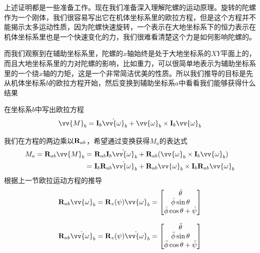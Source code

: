 \documentclass[11pt]{article}
\begin{document}
上述证明都是一些准备工作。现在我们准备深入理解陀螺的运动原理。旋转的陀螺作为一个刚体，我们很容易写出它在机体坐标系里的欧拉方程，但是这个方程并不能揭示太多运动性质，因为陀螺快速旋转，一个表示在大地坐标系下的恒力表示在机体坐标系里也是一个快速变化的力，我们很难看清楚这个力是如何影响陀螺的。

而我们观察到在辅助坐标系里，陀螺的$x$轴始终是处于大地坐标系的$XY$平面上的，而且大地坐标系里的力对陀螺的影响，比如重力，可以很简单地表示为辅助坐标系里的一个绕$x$轴的力矩，这是一个非常简洁优美的性质。所以我们推导的目标是先从机体坐标系$b$的欧拉方程开始，然后变换到辅助坐标系$a$中看看我们能够获得什么结果
 
在坐标系$b$中写出欧拉方程
$$
\vv{M}_b = {\bf I}_b\dot{\vv{\omega}}_b + \vv{\omega}_b \times {\bf I}_b\vv{\omega}_b
$$

我们在方程的两边乘以${\bf R}_{ab}$，希望通过变换获得$M_a$的表达式
\begin{align*}
M_a = {\bf R}_{ab}\vv{M}_b = & \ {\bf R}_{ab}{\bf I}_b\dot{\vv{\omega}}_b + {\bf R}_{ab}(\vv{\omega}_b \times {\bf I}_b\vv{\omega}_b) \\
					 = & \ {\bf I}_b{\bf R}_{ab}\dot{\vv{\omega}}_b + {\bf R}_{ab}\vv{\omega}_b \times {\bf I}_b{\bf R}_{ab}\vv{\omega}_b \\
\end{align*}
根据上一节欧拉运动方程的推导
$$
{\bf R}_{ab}\vv{\omega}_b = {\bf R}_z(\psi)\vv{\omega}_b =\begin{bmatrix}\dot{\theta}	\\ \dot{\phi}\sin\theta	\\ \dot{\phi}\cos\theta +\dot{\psi}	\end{bmatrix} 
$$

$$
{\bf R}_{ab}\dot{\vv{\omega}}_b = {\bf R}_z(\psi)\dot{\vv{\omega}}_b = \begin{bmatrix}\ddot{\theta}	\\ \ddot{\phi}\sin\theta	\\ \ddot{\phi}\cos\theta +\ddot{\psi}	\end{bmatrix} 
$$

\end{document}
